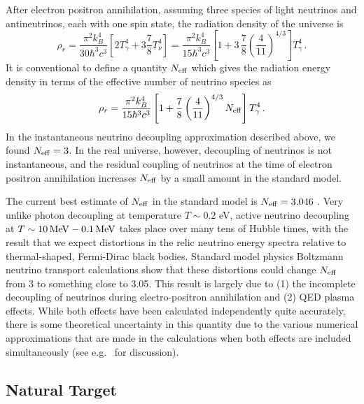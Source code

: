 After electron positron annihilation, assuming three species of light neutrinos and antineutrinos, each with one spin state, the radiation density of the universe is
\begin{equation}
	\rho_r = \frac{\pi^2k_B^4}{30\hbar^3 c^3}\left[2T_\gamma^4 + 3\frac{7}{8}T_\nu^4\right] = \frac{\pi^2k_B^4}{15\hbar^3 c^3}\left[1+3\,\frac{7}{8}\left(\frac{4}{11}\right)^{4/3}\right] T_\gamma^4 \, .
\end{equation}
It is conventional to define a quantity $N_{\rm eff}$ which gives the radiation energy density in terms of the effective number of neutrino species as
\begin{equation}
	\rho_r = \frac{\pi^2k_B^4}{15\hbar^3 c^3}\left[1+\frac{7}{8}\left(\frac{4}{11}\right)^{4/3}N_{\rm eff}\right] T_\gamma^4 \, .
\end{equation}
In the instantaneous neutrino decoupling approximation described above, we found $N_{\rm eff} = 3$.  In the real universe, however, decoupling of neutrinos is not instantaneous, and the residual coupling of neutrinos at the time of electron positron annihilation increases $N_{\rm eff}$ by a small amount in the standard model.

The current best estimate of $N_{\rm eff}$ in the standard model is $N_{\rm eff} = 3.046$ \cite{Mangano:2005cc}.   Very unlike photon decoupling at temperature $T \sim 0.2$ eV, active neutrino decoupling at $T \sim 10 \, {\rm MeV} - 0.1 \, {\rm MeV}$ takes place over many tens of Hubble times, with the result that we expect distortions in the relic neutrino energy spectra relative to thermal-shaped, Fermi-Dirac black bodies. Standard model physics Boltzmann neutrino transport calculations show that these distortions could change $N_{\rm eff}$ from 3 to something close to 3.05. This result is largely due to (1) the incomplete decoupling of neutrinos during electro-positron annihilation and (2) QED plasma effects.  While both effects have been calculated independently quite accurately, there is some theoretical uncertainty in this quantity due to the various numerical approximations that are made in the calculations when both effects are included simultaneously (see e.g.~\cite{Grohs:2015tfy} for discussion).  








\subsection{Natural Target}

